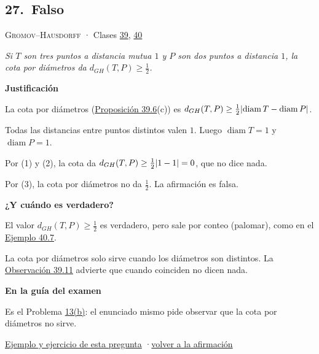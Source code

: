 \documentclass[11pt,a4paper]{article}
\DeclareMathOperator{\diam}{diam}\DeclareMathOperator{\dis}{dis}\DeclareMathOperator{\dist}{dist}
\newcommand{\bloque}[1]{\par\smallskip\noindent\textbf{\color{acento}#1}\par}
\begin{document}
\subsection*{\hypertarget{r-27}{}27.\ \textcolor{bad}{Falso}}
{\small \textsc{Gromov–Hausdorff} · Clases \href{https://decostruttivismo.github.io/MAT2514-repaso/pdf/MAT2514_apuntes_completos.pdf\#nameddest=section.39}{39}, \href{https://decostruttivismo.github.io/MAT2514-repaso/pdf/MAT2514_apuntes_completos.pdf\#nameddest=section.40}{40}}\par
\emph{Si $T$ son tres puntos a distancia mutua $1$ y $P$ son dos puntos a distancia $1$, la cota por diámetros da $d_{GH}(T,P)\ge\frac12$.}
\bloque{Justificación}
\begin{pasos}
\item[(1)] La cota por diámetros (\href{https://decostruttivismo.github.io/MAT2514-repaso/pdf/MAT2514_apuntes_completos.pdf\#nameddest=teorema.39.6}{Proposición 39.6}(c)) es $d_{GH}(T,P)\ge\frac12\abs{\diam T-\diam P}$.
\item[(2)] Todas las distancias entre puntos distintos valen $1$. Luego $\diam T=1$ y $\diam P=1$.
\item[(3)] Por (1) y (2), la cota da $d_{GH}(T,P)\ge\frac12\lvert 1-1\rvert=0$, que no dice nada.
\item[] Por (3), la cota por diámetros no da $\frac12$. La afirmación es falsa.
\end{pasos}
\bloque{¿Y cuándo es verdadero?}
\begin{pasos}
\item[] El valor $d_{GH}(T,P)\ge\frac12$ es verdadero, pero sale por conteo (palomar), como en el \href{https://decostruttivismo.github.io/MAT2514-repaso/pdf/MAT2514_apuntes_completos.pdf\#nameddest=teorema.40.7}{Ejemplo 40.7}.
\item[] La cota por diámetros solo sirve cuando los diámetros son distintos. La \href{https://decostruttivismo.github.io/MAT2514-repaso/pdf/MAT2514_apuntes_completos.pdf\#nameddest=teorema.39.11}{Observación 39.11} advierte que cuando coinciden no dicen nada.
\end{pasos}
\bloque{En la guía del examen}
\begin{pasos}
\item[] Es el Problema \hyperlink{prob-13}{13(b)}: el enunciado mismo pide observar que la cota por diámetros no sirve.
\end{pasos}
\par{}
\par{\small \hyperlink{e-27}{Ejemplo y ejercicio de esta pregunta} \quad·\quad \hyperlink{q-27}{volver a la afirmación}}
\end{document}
